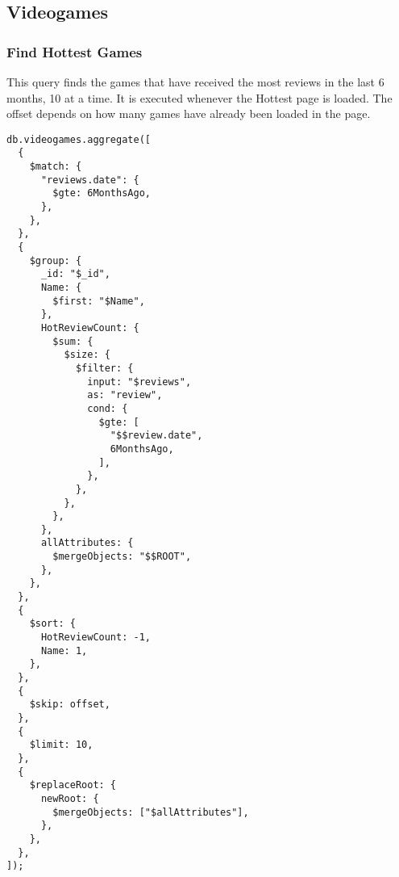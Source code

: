 \subsection{Videogames}
\subsubsection{Find Hottest Games}
This query finds the games that have received the most reviews in the last 6 months, 10 at a time. It is executed whenever the Hottest page is loaded. The offset depends on how many games have already been loaded in the page.
\begin{Verbatim}[fontsize=\footnotesize]
db.videogames.aggregate([
  {
    $match: {
      "reviews.date": {
        $gte: 6MonthsAgo,
      },
    },
  },
  {
    $group: {
      _id: "$_id",
      Name: {
        $first: "$Name",
      },
      HotReviewCount: {
        $sum: {
          $size: {
            $filter: {
              input: "$reviews",
              as: "review",
              cond: {
                $gte: [
                  "$$review.date",
                  6MonthsAgo,
                ],
              },
            },
          },
        },
      },
      allAttributes: {
        $mergeObjects: "$$ROOT",
      },
    },
  },
  {
    $sort: {
      HotReviewCount: -1,
      Name: 1,
    },
  },
  {
    $skip: offset,
  },
  {
    $limit: 10,
  },
  {
    $replaceRoot: {
      newRoot: {
        $mergeObjects: ["$allAttributes"],
      },
    },
  },
]);
\end{Verbatim}
